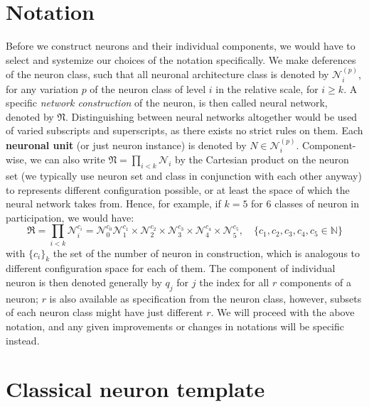 \section{Notation}
Before we construct neurons and their individual components, we would have to select and systemize our choices of the notation specifically. We make deferences of the neuron class, such that all neuronal architecture class is denoted by $\mathcal{N}_{i}^{(p)}$, for any variation $p$ of the neuron class of level $i$ in the relative scale, for $i\geq k$. A specific \textit{network construction} of the neuron, is then called neural network, denoted by $\mathfrak{N}$. Distinguishing between neural networks altogether would be used of varied subscripts and superscripts, as there exists no strict rules on them. Each \textbf{neuronal unit} (or just neuron instance) is denoted by $N\in \mathcal{N}_{i}^{(p)}$. Component-wise, we can also write $\mathfrak{N}=\prod_{i< k} \mathcal{N}_{i}$ by the Cartesian product on the neuron set (we typically use neuron set and class in conjunction with each other anyway) to represents different configuration possible, or at least the space of which the neural network takes from. Hence, for example, if $k=5$ for 6 classes of neuron in participation, we would have: 
\begin{equation}
    \mathfrak{R} = \prod_{i<k} \mathcal{N}_{i}^{c_i} = \mathcal{N}_{0}^{c_{0}}\mathcal{N}_{1}^{c_{1}}\times\mathcal{N}_{2}^{c_{2}}\times\mathcal{N}_{3}^{c_{3}}\times\mathcal{N}_{4}^{c_{4}}\times\mathcal{N}_{5}^{c_{5}}, \quad \{c_{1},c_{2},c_{3},c_{4},c_{5}\in \mathbb{N}\}
\end{equation}
with $\{c_{i}\}_{k}$ the set of the number of neuron in construction, which is analogous to different configuration space for each of them. The component of individual neuron is then denoted generally by $q_{j}$ for $j$ the index for all $r$ components of a neuron; $r$ is also available as specification from the neuron class, however, subsets of each neuron class might have just different $r$. We will proceed with the above notation, and any given improvements or changes in notations will be specific instead. 

\section{Classical neuron template}

